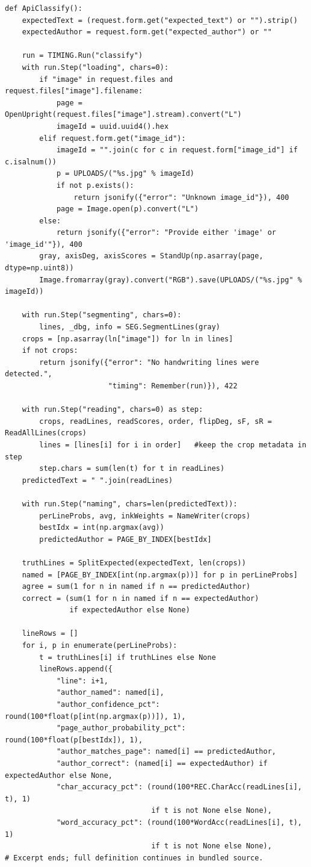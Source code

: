 \begin{lstlisting}[style=plain]
def ApiClassify():
    expectedText = (request.form.get("expected_text") or "").strip()
    expectedAuthor = request.form.get("expected_author") or ""

    run = TIMING.Run("classify")
    with run.Step("loading", chars=0):
        if "image" in request.files and request.files["image"].filename:
            page = OpenUpright(request.files["image"].stream).convert("L")
            imageId = uuid.uuid4().hex
        elif request.form.get("image_id"):
            imageId = "".join(c for c in request.form["image_id"] if c.isalnum())
            p = UPLOADS/("%s.jpg" % imageId)
            if not p.exists():
                return jsonify({"error": "Unknown image_id"}), 400
            page = Image.open(p).convert("L")
        else:
            return jsonify({"error": "Provide either 'image' or 'image_id'"}), 400
        gray, axisDeg, axisScores = StandUp(np.asarray(page, dtype=np.uint8))
        Image.fromarray(gray).convert("RGB").save(UPLOADS/("%s.jpg" % imageId))

    with run.Step("segmenting", chars=0):
        lines, _dbg, info = SEG.SegmentLines(gray)
    crops = [np.asarray(ln["image"]) for ln in lines]
    if not crops:
        return jsonify({"error": "No handwriting lines were detected.",
                        "timing": Remember(run)}), 422

    with run.Step("reading", chars=0) as step:
        crops, readLines, readScores, order, flipDeg, sF, sR = ReadAllLines(crops)
        lines = [lines[i] for i in order]   #keep the crop metadata in step
        step.chars = sum(len(t) for t in readLines)
    predictedText = " ".join(readLines)

    with run.Step("naming", chars=len(predictedText)):
        perLineProbs, avg, inkWeights = NameWriter(crops)
        bestIdx = int(np.argmax(avg))
        predictedAuthor = PAGE_BY_INDEX[bestIdx]

    truthLines = SplitExpected(expectedText, len(crops))
    named = [PAGE_BY_INDEX[int(np.argmax(p))] for p in perLineProbs]
    agree = sum(1 for n in named if n == predictedAuthor)
    correct = (sum(1 for n in named if n == expectedAuthor)
               if expectedAuthor else None)

    lineRows = []
    for i, p in enumerate(perLineProbs):
        t = truthLines[i] if truthLines else None
        lineRows.append({
            "line": i+1,
            "author_named": named[i],
            "author_confidence_pct": round(100*float(p[int(np.argmax(p))]), 1),
            "page_author_probability_pct": round(100*float(p[bestIdx]), 1),
            "author_matches_page": named[i] == predictedAuthor,
            "author_correct": (named[i] == expectedAuthor) if expectedAuthor else None,
            "char_accuracy_pct": (round(100*REC.CharAcc(readLines[i], t), 1)
                                  if t is not None else None),
            "word_accuracy_pct": (round(100*WordAcc(readLines[i], t), 1)
                                  if t is not None else None),
# Excerpt ends; full definition continues in bundled source.
\end{lstlisting}
